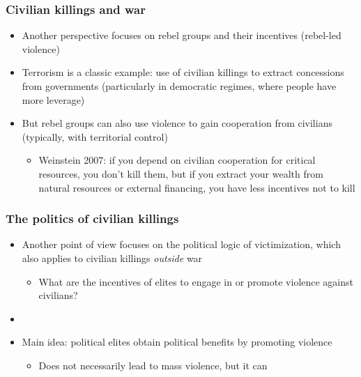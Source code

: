 \documentclass[utf8, xcolor=dvipsnames, handout]{beamer}
\begin{document}
\begin{frame}
\frametitle{Civilian killings and war}
\centering

\begin{itemize}
  \item<1-> Another perspective focuses on rebel groups and their incentives (rebel-led violence)
  \item<2-> Terrorism is a classic example: use of civilian killings to extract concessions from governments (particularly in democratic regimes, where people have more leverage)
  \item<3-> But rebel groups can also use violence to gain cooperation from civilians (typically, with territorial control)
  \begin{itemize}
    \item Weinstein 2007: if you depend on civilian cooperation for critical resources, you don't kill them, but if you extract your wealth from natural resources or external financing, you have less incentives not to kill
  \end{itemize}
\end{itemize}

\end{frame}

\begin{frame}
\frametitle{The politics of civilian killings}
\centering

\begin{itemize}
  \item<1-> Another point of view focuses on the political logic of victimization, which also applies to civilian killings \textit{outside} war
  \begin{itemize}
    \item What are the incentives of elites to engage in or promote violence against civilians?
  \end{itemize}
  \item[]
  \item<2-> Main idea: political elites obtain political benefits by promoting violence
  \begin{itemize}
    \item Does not necessarily lead to mass violence, but it can
  \end{itemize}
\end{itemize}

\end{frame}
\end{document}
